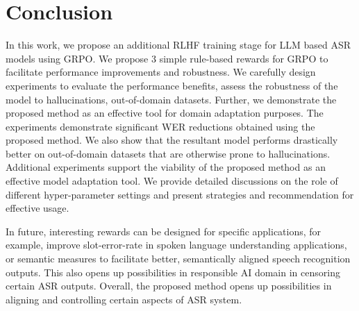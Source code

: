 \documentclass[conference]{IEEEtran}
\begin{document}
\section{Conclusion}\label{sec:conclusion}
In this work, we propose an additional RLHF training stage for LLM based ASR models using GRPO.
We propose 3 simple rule-based rewards for GRPO to facilitate performance improvements and robustness.
We carefully design experiments to evaluate the performance benefits, assess the robustness of the model to hallucinations, out-of-domain datasets.
Further, we demonstrate the proposed method as an effective tool for domain adaptation purposes.
The experiments demonstrate significant WER reductions obtained using the proposed method.
We also show that the resultant model performs drastically better on out-of-domain datasets that are otherwise prone to hallucinations.
Additional experiments support the viability of the proposed method as an effective model adaptation tool.
We provide detailed discussions on the role of different hyper-parameter settings and present strategies and recommendation for effective usage.

In future, interesting rewards can be designed for specific applications, for example, improve slot-error-rate in spoken language understanding applications, or semantic measures to facilitate better, semantically aligned speech recognition outputs.
This also opens up possibilities in responsible AI domain in censoring certain ASR outputs.
Overall, the proposed method opens up possibilities in aligning and controlling certain aspects of ASR system.



\end{document}
